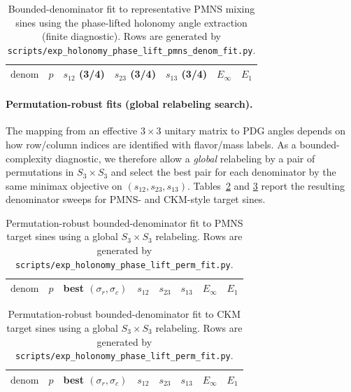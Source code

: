 \begin{table}[t]
\centering
\scriptsize
\setlength{\tabcolsep}{6pt}
\renewcommand{\arraystretch}{1.15}
\begin{tabular}{rrrrrrr}
\toprule
$\mathrm{denom}$ & $p$ & $s_{12}$ (3/4) & $s_{23}$ (3/4) & $s_{13}$ (3/4) & $E_\infty$ & $E_1$ \\
\midrule
%
\end{tabular}
\caption{Bounded-denominator fit to representative PMNS mixing sines using the phase-lifted holonomy angle extraction (finite diagnostic). Rows are generated by \texttt{scripts/exp\_holonomy\_phase\_lift\_pmns\_denom\_fit.py}.}
\label{tab:holonomy_pmns_denom_fit}
\end{table}

\paragraph{Permutation-robust fits (global relabeling search).}
The mapping from an effective $3\times 3$ unitary matrix to PDG angles depends on how row/column indices are identified with flavor/mass labels.
As a bounded-complexity diagnostic, we therefore allow a \emph{global} relabeling by a pair of permutations in $S_3\times S_3$ and select the best pair for each denominator by the same minimax objective on $(s_{12},s_{23},s_{13})$.
Tables~\ref{tab:holonomy_perm_fit_pmns} and \ref{tab:holonomy_perm_fit_ckm} report the resulting denominator sweeps for PMNS- and CKM-style target sines.

\begin{table}[t]
\centering
\scriptsize
\setlength{\tabcolsep}{4pt}
\renewcommand{\arraystretch}{1.15}
\begin{tabular}{rrrrrrrr}
\toprule
$\mathrm{denom}$ & $p$ & best $(\sigma_r,\sigma_c)$ & $s_{12}$ & $s_{23}$ & $s_{13}$ & $E_\infty$ & $E_1$ \\
\midrule
%
\end{tabular}
\caption{Permutation-robust bounded-denominator fit to PMNS target sines using a global $S_3\times S_3$ relabeling. Rows are generated by \texttt{scripts/exp\_holonomy\_phase\_lift\_perm\_fit.py}.}
\label{tab:holonomy_perm_fit_pmns}
\end{table}

\begin{table}[t]
\centering
\scriptsize
\setlength{\tabcolsep}{4pt}
\renewcommand{\arraystretch}{1.15}
\begin{tabular}{rrrrrrrr}
\toprule
$\mathrm{denom}$ & $p$ & best $(\sigma_r,\sigma_c)$ & $s_{12}$ & $s_{23}$ & $s_{13}$ & $E_\infty$ & $E_1$ \\
\midrule
%
\end{tabular}
\caption{Permutation-robust bounded-denominator fit to CKM target sines using a global $S_3\times S_3$ relabeling. Rows are generated by \texttt{scripts/exp\_holonomy\_phase\_lift\_perm\_fit.py}.}
\label{tab:holonomy_perm_fit_ckm}
\end{table}

